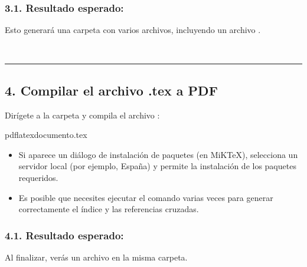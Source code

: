 \documentclass[a4paper,10pt,oneside,spanish,openany]{sphinxmanual}
\begin{document}
\subsubsection{3.1. Resultado esperado:}
\label{\detokenize{configuracion_inicial/009.Generar_PDF:resultado-esperado}}
\sphinxAtStartPar
Esto generará una carpeta  con varios archivos, incluyendo un archivo .

\sphinxAtStartPar
📸 

\sphinxAtStartPar
{}


\bigskip\hrule\bigskip



\subsection{4. Compilar el archivo .tex a PDF}
\label{\detokenize{configuracion_inicial/009.Generar_PDF:compilar-el-archivo-tex-a-pdf}}
\sphinxAtStartPar
Dirígete a la carpeta  y compila el archivo :

\begin{sphinxVerbatim}[commandchars=\\\{\}]
pdflatexdocumento.tex
\end{sphinxVerbatim}
\begin{itemize}
\item {} 
\sphinxAtStartPar
Si aparece un diálogo de instalación de paquetes (en MiKTeX), selecciona un servidor local (por ejemplo, España) y permite la instalación de los paquetes requeridos.

\item {} 
\sphinxAtStartPar
Es posible que necesites ejecutar el comando varias veces para generar correctamente el índice y las referencias cruzadas.

\end{itemize}


\subsubsection{4.1. Resultado esperado:}
\label{\detokenize{configuracion_inicial/009.Generar_PDF:id1}}
\sphinxAtStartPar
Al finalizar, verás un archivo  en la misma carpeta.

\sphinxAtStartPar
{}
\end{document}
